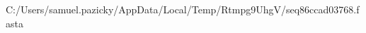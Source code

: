 \documentclass[10pt]{article}
\begin{document}
\begin{texshade}{C:/Users/samuel.pazicky/AppData/Local/Temp/Rtmpg9UhgV/seq86ccad03768.fasta}
\hideconsensus
{}
\hidelogoscale
\hidenames
{}
\showlegend
\end{texshade}
\end{document}
